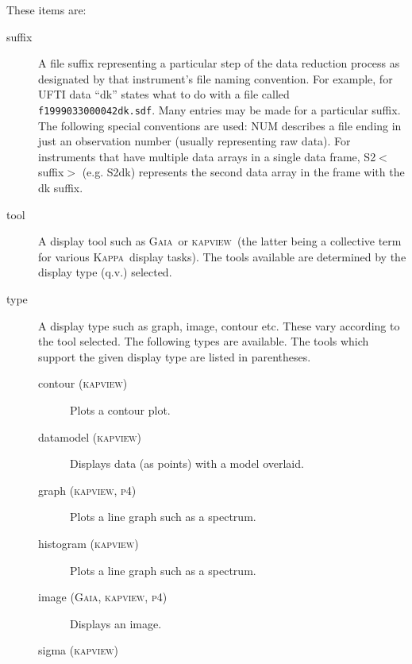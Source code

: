 \documentclass[twoside,11pt]{article}
\newcommand{\xref}[3]{#1}
\renewcommand{\_}{\texttt{\symbol{95}}}
\newcommand{\Kappa}{\xref{{\textsc{Kappa}}}{sun95}{}}
\newcommand{\kapview}{\textsc{kapview}}
\newcommand{\gaia}{\xref{{\textsc{Gaia}}}{sun214}{}}
\begin{document}
These items are:

\begin{description}
\item[suffix] \mbox{}

A file suffix representing a particular step of the data reduction
process as designated by that instrument's file naming convention. For
example, for UFTI data ``dk'' states what to do with a file called
 \texttt{f19990330\_00042\_dk.sdf}. Many entries may be made for a particular
suffix. The following special conventions are used: NUM describes a
file ending in just an observation number (usually representing raw
data). For instruments that have multiple data arrays in a single data
frame, S2$<$suffix$>$ (e.g. S2dk) represents the second data array in the
frame with the \_dk suffix.

\item[tool] \mbox{}

A display tool such as \gaia\ or \kapview\ (the latter being a collective
term for various \Kappa\ display tasks). The tools available are
determined by the display type (q.v.) selected.

\item[type] \mbox{}

A display type such as graph, image, contour etc. These vary according 
to the tool selected.   The following types are available.  The tools
which support the given display type are listed in parentheses.

\begin{description}
\item[contour (\kapview)] \mbox{}

Plots a contour plot.

\item[datamodel (\kapview)] \mbox{}

Displays data (as points) with a model overlaid.

\item[graph (\kapview, \textsc{p4})] \mbox{}

Plots a line graph such as a spectrum.

\item[histogram (\kapview)] \mbox{}

Plots a line graph such as a spectrum.

\item[image (\gaia, \kapview, \textsc{p4})] \mbox{}

Displays an image.

\item[sigma (\kapview)] \mbox{}


\end{description}
\end{description}
\end{document}
